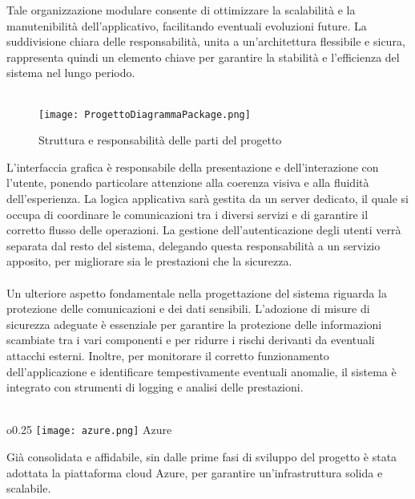 Tale organizzazione modulare consente di ottimizzare
la scalabilità e la manutenibilità dell'applicativo,
facilitando eventuali evoluzioni future.
La suddivisione chiara delle responsabilità, unita a un'architettura flessibile e sicura,
rappresenta quindi un elemento chiave per garantire
la stabilità e l'efficienza del sistema nel lungo periodo.\\
\\
\begin{figure}[htb]
    \centering
    \texttt{[image: ProgettoDiagrammaPackage.png]}
    \caption{Struttura e responsabilità delle parti del progetto}
\end{figure}
\clearpage
L'interfaccia grafica è responsabile della presentazione e dell'interazione con l'utente,
ponendo particolare attenzione alla coerenza visiva e alla fluidità dell'esperienza.
La logica applicativa sarà gestita da un server dedicato,
il quale si occupa di coordinare le comunicazioni tra i diversi servizi
e di garantire il corretto flusso delle operazioni.
La gestione dell'autenticazione degli utenti verrà separata dal resto del sistema,
delegando questa responsabilità a un servizio apposito,
per migliorare sia le prestazioni che la sicurezza.\\
\\
Un ulteriore aspetto fondamentale nella progettazione del sistema riguarda
la protezione delle comunicazioni e dei dati sensibili.
L'adozione di misure di sicurezza adeguate è essenziale
per garantire la protezione delle informazioni scambiate tra i vari componenti e
per ridurre i rischi derivanti da eventuali attacchi esterni.
Inoltre, per monitorare il corretto funzionamento dell'applicazione e
identificare tempestivamente eventuali anomalie,
il sistema è integrato con strumenti di logging e analisi delle prestazioni.\\
\\
\begin{wrapfigure}{o}{0.25\textwidth}
    \centering
    \texttt{[image: azure.png]}
    Azure
\end{wrapfigure}
Già consolidata e affidabile,
sin dalle prime fasi di sviluppo del progetto è stata adottata la piattaforma cloud Azure,
per garantire un'infrastruttura solida e scalabile.
\clearpage
